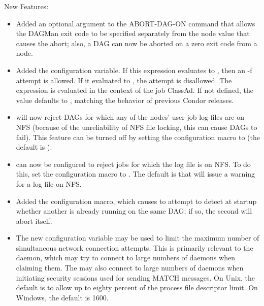 \noindent New Features:

\begin{itemize}

\item Added an optional argument to the  ABORT-DAG-ON
command that allows the DAGMan exit code to be specified separately
from the node value that causes the abort; also, a DAG can now be
aborted on a zero exit code from a node.

\item Added the  configuration variable.
If this expression evaluates to ,
then an  -f attempt is allowed.  If it evaluated to ,
the attempt is disallowed.
The expression is evaluated in the context of the job ClassAd.
If not defined, the value defaults to , matching the behavior of
previous Condor releases.

\item {} will now reject DAGs for which any of the nodes'
user job log files are on NFS (because of the unreliability of NFS
file locking, this can cause DAGs to fail).  This feature can be
turned off by setting the 
configuration macro to  (the default is ).

\item {} can now be configured to reject jobs for which
the log file is on NFS.
To do this, set the 
configuration macro to .
The default is that  will issue a warning
for a log file on NFS.

\item Added the  configuration macro,
which causes
 to attempt to detect at startup whether another
 is already running on the same DAG; if so, the second
 will abort itself.

\item The new configuration variable
 may be used to limit the
maximum number of simultaneous network connection attempts.  This is
primarily relevant to the  daemon, which may try to connect to
large numbers of  daemons when claiming them.
The  may also
connect to large numbers of  daemons when initiating
security sessions
used for sending MATCH messages.  On Unix, the default is to allow up to
eighty percent of the process file descriptor limit.  On Windows, the
default is 1600.


\end{itemize}
